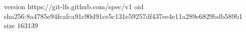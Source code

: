 version https://git-lfs.github.com/spec/v1
oid sha256:8a4785e94fcafca91c90d91ce5c131e59257df437ee4e11a289e6829bdb589b1
size 163139
